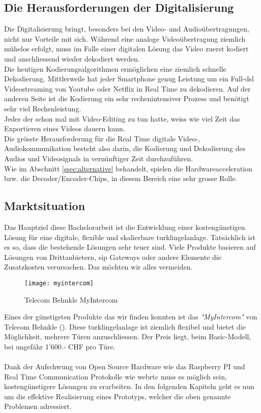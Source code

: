 \subsection{Die Herausforderungen der Digitalisierung}
Die Digitalisierung bringt, besonders bei den Video- und Audioübertragungen, nicht nur Vorteile mit sich.  Während eine analoge Videoübertragung ziemlich mühelos erfolgt, muss im Falle einer digitalen Lösung das Video zuerst kodiert und anschliessend wieder dekodiert werden.
\\
Die heutigen Kodierungsalgorithmen ermöglichen eine ziemlich schnelle Dekodierung. Mittlerweile hat jeder Smartphone genug Leistung um ein Full-\gls{dsl} Videostreaming von Youtube oder Netflix in Real Time zu dekodieren. Auf der anderen Seite ist die Kodierung ein sehr rechenintensiver Prozess und benötigt sehr viel Rechenleistung.
\\
Jeder der schon mal mit Video-Editing zu tun hatte, weiss wie viel Zeit das Exportieren eines Videos dauern kann.
\\
Die grösste Herausforderung für die Real Time digitale Video-, Audiokommunikation besteht also darin, die Kodierung und Dekodierung des Audios und Videosignals in vernünftiger Zeit durchzuführen.
\\
Wie im Abschnitt \ref{ssec:alternative} behandelt, spielen die Hardwareacceleration bzw. die Decoder/Encoder-Chips, in diesem Bereich eine sehr grosse Rolle.  

\subsection{Marktsituation}
\label{sec:marktsituation}
Das Hauptziel diese Bachelorarbeit ist die Entwicklung einer kostengünstigen Lösung für eine digitale, flexible und skalierbare \gls{turklingelanlage}. Tatsächlich ist es so, dass die bestehende Lösungen sehr teuer sind. Viele Produkte basieren auf Lösungen von Drittanbietern, \gls{sip} Gateways oder andere Elemente die Zusatzkosten verursachen. Das möchten wir alles vermeiden.

\begin{figure}[htb!]
	\begin{center}
		\texttt{[image: myintercom]}
		\caption[Telecom Behnkle MyIntercom]{Telecom Behnkle MyIntercom}
		\label{fig:myintercom}
	\end{center}
\end{figure}

Eines der günstigsten Produkte das wir finden konnten ist das \textit{"MyIntercom"} von Telecom Behnkle (). Diese \gls{turklingelanlage} ist ziemlich flexibel und bietet die Möglichkeit, mehrere Türen anzuschliessen. Der Preis liegt, beim Basic-Modell, bei ungefähr 1’600.- CHF pro Türe.
\\
\\
Dank der Aufschwung von Open Source Hardware wie das Raspberry PI und Real Time Communication Protokolle wie \gls{webrtc} muss es möglich sein, kostengünstigere Lösungen zu erarbeiten. In den folgenden Kapiteln geht es nun um die effektive Realisierung eines Prototyps, welcher die oben genannte Problemen adressiert.
\newpage